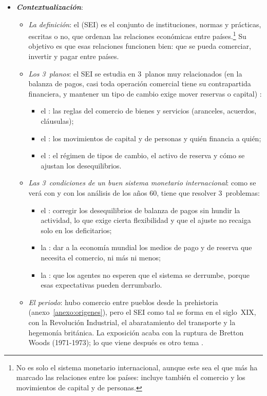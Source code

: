 \documentclass[11pt]{article}
\begin{document}
\begin{itemize}
\item \textbf{\emph{Contextualización}}:
  \begin{itemize}
  \item \emph{La definición}: el  (SEI) es el conjunto de instituciones, normas y prácticas, escritas o no, que ordenan las relaciones económicas entre países.\footnote{No es solo el sistema monetario internacional, aunque este sea el que más ha marcado las relaciones entre los países: incluye también el comercio y los movimientos de capital y de personas.} Su objetivo es que esas relaciones funcionen bien: que se pueda comerciar, invertir y pagar entre países.
  \item \emph{Los 3~planos}: el SEI se estudia en 3~planos muy relacionados (en la balanza de pagos, casi toda operación comercial tiene su contrapartida financiera, y mantener un tipo de cambio exige mover reservas o capital) :
    \begin{itemize}
    \item el : las reglas del comercio de bienes y servicios (aranceles, acuerdos, cláusulas);
    \item el : los movimientos de capital y de personas y quién financia a quién;
    \item el : el régimen de tipos de cambio, el activo de reserva y cómo se ajustan los desequilibrios.
    \end{itemize}
  \item \emph{Las 3~condiciones de un buen sistema monetario internacional}: como se verá con  y con los análisis de los años 60\nocite{Eichengreen2019Globalizing}, tiene que resolver 3~problemas:
    \begin{itemize}
    \item el : corregir los desequilibrios de balanza de pagos sin hundir la actividad, lo que exige cierta flexibilidad y que el ajuste no recaiga solo en los deficitarios;
    \item la : dar a la economía mundial los medios de pago y de reserva que necesita el comercio, ni más ni menos;
    \item la : que los agentes no esperen que el sistema se derrumbe, porque esas expectativas pueden derrumbarlo.
    \end{itemize}
  \item \emph{El periodo}: hubo comercio entre pueblos desde la prehistoria (anexo~\ref{anexo:origenes}), pero el SEI como tal se forma en el siglo~XIX, con la Revolución Industrial, el abaratamiento del transporte y la hegemonía británica. La exposición acaba con la ruptura de Bretton Woods (1971-1973); lo que viene después es otro tema .
  \end{itemize}


\end{itemize}
\end{document}

